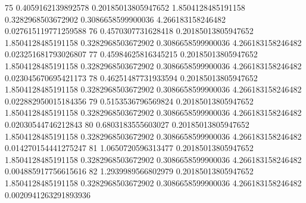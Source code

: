 {75 0.4059162139892578 0.20185013805947652 1.8504128485191158 0.3282968503672902 0.3086658599900036 4.266183158246482 0.027615119771259588
76 0.4570307731628418 0.20185013805947652 1.8504128485191158 0.3282968503672902 0.3086658599900036 4.266183158246482 0.023251681793026807
77 0.45984625816345215 0.20185013805947652 1.8504128485191158 0.3282968503672902 0.3086658599900036 4.266183158246482 0.023045670695421173
78 0.46251487731933594 0.20185013805947652 1.8504128485191158 0.3282968503672902 0.3086658599900036 4.266183158246482 0.022882950015184356
79 0.5153536796569824 0.20185013805947652 1.8504128485191158 0.3282968503672902 0.3086658599900036 4.266183158246482 0.02030544746212843
80 0.6803183555603027 0.20185013805947652 1.8504128485191158 0.3282968503672902 0.3086658599900036 4.266183158246482 0.014270154441275247
81 1.0650720596313477 0.20185013805947652 1.8504128485191158 0.3282968503672902 0.3086658599900036 4.266183158246482 0.004885917756615616
82 1.2939989566802979 0.20185013805947652 1.8504128485191158 0.3282968503672902 0.3086658599900036 4.266183158246482 0.0020941263291893936
}\tableexpivwaitwordlang
